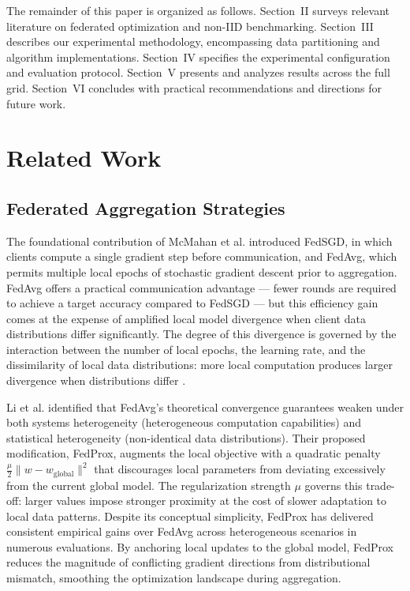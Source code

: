 \documentclass[conference]{IEEEtran}
\begin{document}
The remainder of this paper is organized as follows. Section~II surveys relevant literature on federated optimization and non-IID benchmarking. Section~III describes our experimental methodology, encompassing data partitioning and algorithm implementations. Section~IV specifies the experimental configuration and evaluation protocol. Section~V presents and analyzes results across the full grid. Section~VI concludes with practical recommendations and directions for future work.


\section{Related Work}

\subsection{Federated Aggregation Strategies}

The foundational contribution of McMahan et al. \cite{mcmahan2017fedavg} introduced FedSGD, in which clients compute a single gradient step before communication, and FedAvg, which permits multiple local epochs of stochastic gradient descent prior to aggregation. FedAvg offers a practical communication advantage --- fewer rounds are required to achieve a target accuracy compared to FedSGD --- but this efficiency gain comes at the expense of amplified local model divergence when client data distributions differ significantly. The degree of this divergence is governed by the interaction between the number of local epochs, the learning rate, and the dissimilarity of local data distributions: more local computation produces larger divergence when distributions differ \cite{kairouz2021advances}.

Li et al. \cite{li2020fedprox} identified that FedAvg's theoretical convergence guarantees weaken under both systems heterogeneity (heterogeneous computation capabilities) and statistical heterogeneity (non-identical data distributions). Their proposed modification, FedProx, augments the local objective with a quadratic penalty $\frac{\mu}{2}\|w - w_{\text{global}}\|^2$ that discourages local parameters from deviating excessively from the current global model. The regularization strength $\mu$ governs this trade-off: larger values impose stronger proximity at the cost of slower adaptation to local data patterns. Despite its conceptual simplicity, FedProx has delivered consistent empirical gains over FedAvg across heterogeneous scenarios in numerous evaluations. By anchoring local updates to the global model, FedProx reduces the magnitude of conflicting gradient directions from distributional mismatch, smoothing the optimization landscape during aggregation.
\end{document}
